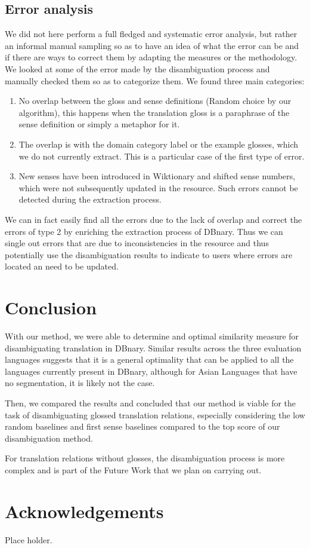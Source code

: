 \documentclass[10pt, a4paper]{article}
\begin{document}
\subsection{Error analysis}

We did not here perform a full fledged and systematic error analysis, but rather an informal manual sampling so as to have an idea of what the error can be and if there are ways to correct them by adapting the measures or the methodology.
We looked at some of the error made by the disambiguation process and manually checked them so as to categorize them. We found three main categories:
\begin{enumerate}
\item No overlap between the gloss and sense definitions (Random choice by our algorithm), this happens when the translation gloss is a paraphrase of the sense definition or simply a metaphor for it.
\item The overlap is with the domain category label or the example glosses, which we do not currently extract. This is a particular case of the first type of error.
\item New senses have been introduced in Wiktionary and shifted sense numbers, which were not subsequently updated in the resource. Such errors cannot be detected during the extraction process.
\end{enumerate}

We can in fact easily find all the errors due to the lack of overlap and correct the errors of type 2 by enriching the extraction process of DBnary. Thus we can single out errors that are due to inconsistencies in the resource and thus potentially use the disambiguation results to indicate to users where errors are located an need to be updated.

\section{Conclusion}

With our method, we were able to determine and optimal similarity measure for disambiguating translation in DBnary. Similar results across the three evaluation languages suggests that it is a general optimality that can be applied to all the languages currently present in DBnary, although for Asian Languages that have no segmentation, it is likely not the case.

Then, we compared the results and concluded that our method is viable for the task of disambiguating glossed translation relations, especially considering the low random baselines and first sense baselines compared to the top score of our disambiguation method.

For translation relations without glosses, the disambiguation process is more complex and is part of the Future Work that we plan on carrying out.

\section{Acknowledgements}

Place holder.




\end{document}
